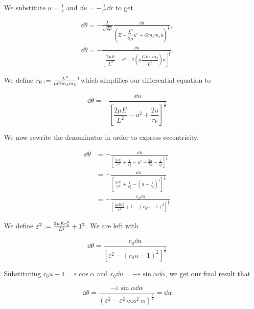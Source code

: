 \begin{frame}{\subsecname}
We substitute \(u = \frac{1}{r}\) and \(\dd u = - \frac{1}{r^2}\dd r\) to get

\begin{align}
\dd \theta = -\frac{L}{\sqrt{2\mu}} \frac{\dd u}{\left( E - \dfrac{L^2}{2\mu}u^2 + Gm_1m_2u \right)^{\frac{1}{2}}},\\
\dd \theta = - \frac{\dd u}{\left[ \dfrac{2\mu E}{L^2} - u^2 +2 \left( \mu\dfrac{Gm_1m_2}{L^2}\right)u \right]^{\frac{1}{2}}}.
\end{align}
\end{frame}

\begin{frame}{\subsecname}
We define \(r_0 := \frac{L^2}{\mu Gm_1m_2}\footnotemark \)which simplifies our differential equation to

\begin{equation}
\dd \theta = - \frac{\dd u}{\left[ \dfrac{2\mu E}{L^2} - u^2 +\dfrac{2u}{r_0} \right]^{\frac{1}{2}}}
\end{equation}


\end{frame}

\begin{frame}{\subsecname}
We now rewrite the denominator in order to express eccentricity.

\begin{align}
\dd \theta &= - \frac{\dd u}{\left[ \frac{2\mu E}{L^2} + \frac{1}{r_0^2} - u^2 +\frac{2u}{r_0} - \frac{1}{r_0^2} \right]^{\frac{1}{2}}}\\
&= -\frac{\dd u}{\left[ \frac{2\mu E}{L^2} + \frac{1}{r_0^2} - \left(u - \frac{1}{r_0}\right)^2\right]^{\frac{1}{2}}}\\
&= -\frac{r_0 \dd u}{\left[ \frac{2\mu E r_0^2}{L^2} + 1 - \left(r_0u-1\right)^2\right]^{\frac{1}{2}}}
\end{align}

\end{frame}

\begin{frame}{\subsecname}
We define \(\varepsilon^2 := \frac{2\mu Er_0^2}{L^2} + 1 \footnotemark\). We are left with

\begin{equation}
\dd\theta = \frac{r_0\dd u}{\left[\varepsilon^2 - (r_0u-1)^2\right]^{\frac{1}{2}}}
\end{equation}

Substituting \(r_0u-1 = \varepsilon \cos \alpha \) and \(r_0\dd u = -\varepsilon \sin \alpha \dd\alpha\), we get our final result that 

\begin{equation}
\dd \theta = \frac{-\varepsilon \sin \alpha \dd \alpha}{\left(\varepsilon^2 - \varepsilon^2 \cos^2 \alpha\right)^{\frac{1}{2}}} = \dd \alpha
\end{equation}


\end{frame}

